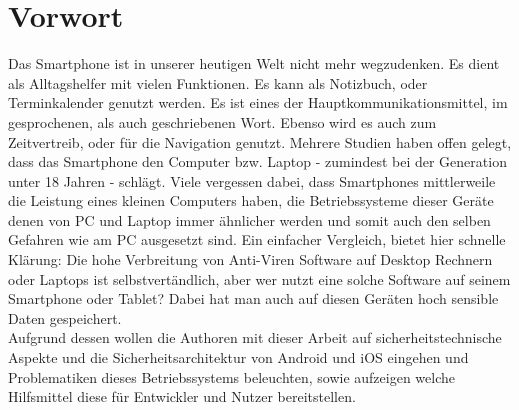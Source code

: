 \section{Vorwort}
	Das Smartphone ist in unserer heutigen Welt nicht mehr wegzudenken. Es dient
	als Alltagshelfer mit vielen Funktionen. Es kann als Notizbuch, oder
	Terminkalender genutzt werden. Es ist eines der Hauptkommunikationsmittel, im
	gesprochenen, als auch geschriebenen Wort. Ebenso wird es auch zum
	Zeitvertreib, oder für die Navigation genutzt. Mehrere Studien haben offen 
	gelegt, dass das Smartphone den Computer bzw. Laptop - zumindest bei der
	Generation unter 18 Jahren - schlägt.
	\cite{BitkomStudieJugend2014}
	\cite{MPFSStudie2013}
	Viele vergessen dabei, dass Smartphones mittlerweile die Leistung eines kleinen
	Computers haben, die Betriebssysteme dieser Geräte denen von PC und Laptop
	immer ähnlicher werden und somit auch den selben Gefahren wie am PC ausgesetzt
	sind. Ein einfacher Vergleich, bietet hier schnelle	Klärung: Die hohe
	Verbreitung von Anti-Viren Software auf Desktop Rechnern oder Laptops ist
	selbstvertändlich, aber wer nutzt eine solche Software auf seinem
	Smartphone oder Tablet? Dabei hat man auch auf diesen Geräten hoch sensible
	Daten gespeichert.\\
	Aufgrund dessen wollen die Authoren mit dieser Arbeit auf
	sicherheitstechnische Aspekte und die Sicherheitsarchitektur von Android und iOS eingehen und
	Problematiken dieses Betriebssystems beleuchten, sowie aufzeigen welche
	Hilfsmittel diese für Entwickler und Nutzer bereitstellen.
